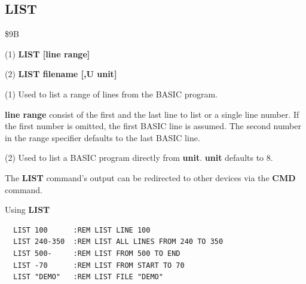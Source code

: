 
\newpage
\subsection{LIST}
\begin{description}[leftmargin=2cm,style=nextline]
\item [Token:] \$9B
\item [Format:] (1) {\bf LIST [line range]}

(2) {\bf LIST filename [,U unit]}

\item [Usage:] (1) Used to list a range of lines from the BASIC program.

               {\bf line range} consist of the first and the last
               line to list or a single line number.
               If the first number is omitted, the
               first BASIC line is assumed.
               The second number in the range specifier defaults
               to the last BASIC line.

               (2) Used to list a BASIC program directly from {\bf unit}.
               {\bf unit} defaults to 8.

\item [Remarks:] The {\bf LIST} command's output can be redirected
                 to other devices via the {\bf CMD} command.

\item [Example:] Using {\bf LIST}
\begin{tcolorbox}[colback=black,coltext=white]
\verbatimfont{\codefont}
\begin{verbatim}
  LIST 100      :REM LIST LINE 100
  LIST 240-350  :REM LIST ALL LINES FROM 240 TO 350
  LIST 500-     :REM LIST FROM 500 TO END
  LIST -70      :REM LIST FROM START TO 70
  LIST "DEMO"   :REM LIST FILE "DEMO"
\end{verbatim}
\end{tcolorbox}
\end{description}


\newpage
